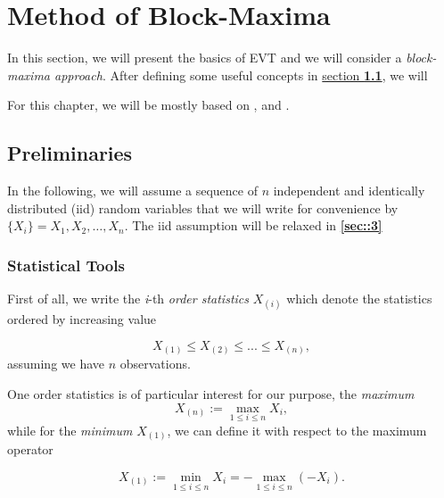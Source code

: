 \documentclass[11pt,a4paper,openany ]{book}
\begin{document}
\setcounter{mtc}{1}
\chapter{Method of Block-Maxima} \label{sec::1}
\vspace{-1cm}
\minitoc \thispagestyle{empty}
 \vspace{1.5cm}

In this section, we will present the basics of EVT and we will consider a 
\textit{block-maxima approach}. After defining some useful concepts in 
\hyperref[sec::1.1]{section \textbf{1.1}}, we will

For this chapter, we will be mostly based on \citet[chapter 3]{coles_introduction_2001}, \citet{beirlant_statistics_2006} and \citet{reiss_statistical_2007}.

\newpage
\section{Preliminaries}\label{sec::1.1}


In the following, we will assume a sequence of $n$ independent and identically distributed (iid) random variables that we will write for convenience by $\{X_i\}=X_1,X_2,\dots ,X_n$. The iid assumption will be relaxed in \hyperref[sec::3]{\textbf{\ref{sec::3}}}

\subsection*{Statistical Tools}
First of all, we write the \emph{i}-th \emph{order statistics} $X_{(i)} $ which denote the statistics ordered by increasing value 

\begin{equation} \label{ordereds}
X_{(1)}\leq X_{(2)}\leq ...\leq X_{(n)},
\end{equation}
assuming we have $n$ observations.

One order statistics is of particular interest for our purpose, the \emph{maximum}
\begin{equation} \label{max}
X_{(n)}:=\displaystyle{\max_{1\leq i\leq n}}X_i,
\end{equation}
while for the \emph{minimum} $X_{(1)}$, we can define it with respect to the maximum operator

\begin{equation}\label{min}
X_{(1)}:=\displaystyle{\min_{1\leq i\leq n}}X_i=- \displaystyle{\max_{1\leq i\leq n}}(-X_i).
\end{equation}
\end{document}
